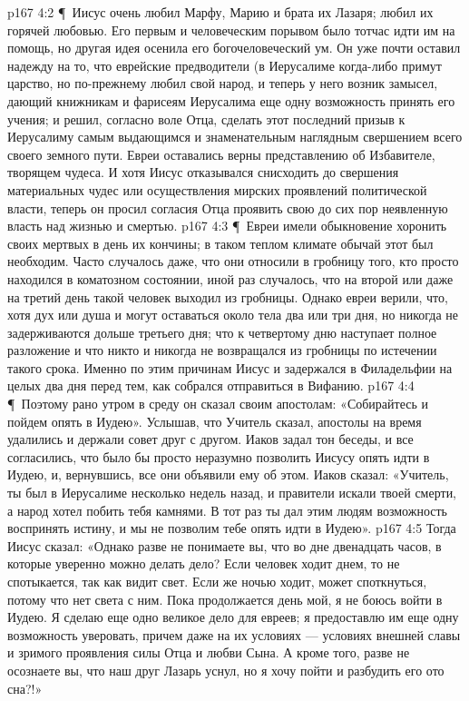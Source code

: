 \vs p167 4:2 \P\ Иисус очень любил Марфу, Марию и брата их Лазаря; любил их горячей любовью. Его первым и человеческим порывом было тотчас идти им на помощь, но другая идея осенила его богочеловеческий ум. Он уже почти оставил надежду на то, что еврейские предводители (в Иерусалиме когда\hyp{}либо примут царство, но по\hyp{}прежнему любил свой народ, и теперь у него возник замысел, дающий книжникам и фарисеям Иерусалима еще одну возможность принять его учения; и решил, согласно воле Отца, сделать этот последний призыв к Иерусалиму самым выдающимся и знаменательным наглядным свершением всего своего земного пути. Евреи оставались верны представлению об Избавителе, творящем чудеса. И хотя Иисус отказывался снисходить до свершения материальных чудес или осуществления мирских проявлений политической власти, теперь он просил согласия Отца проявить свою до сих пор неявленную власть над жизнью и смертью.
\vs p167 4:3 \P\ Евреи имели обыкновение хоронить своих мертвых в день их кончины; в таком теплом климате обычай этот был необходим. Часто случалось даже, что они относили в гробницу того, кто просто находился в коматозном состоянии, иной раз случалось, что на второй или даже на третий день такой человек выходил из гробницы. Однако евреи верили, что, хотя дух или душа и могут оставаться около тела два или три дня, но никогда не задерживаются дольше третьего дня; что к четвертому дню наступает полное разложение и что никто и никогда не возвращался из гробницы по истечении такого срока. Именно по этим причинам Иисус и задержался в Филадельфии на целых два дня перед тем, как собрался отправиться в Вифанию.
\vs p167 4:4 \P\ Поэтому рано утром в среду он сказал своим апостолам: «Собирайтесь и пойдем опять в Иудею». Услышав, что Учитель сказал, апостолы на время удалились и держали совет друг с другом. Иаков задал тон беседы, и все согласились, что было бы просто неразумно позволить Иисусу опять идти в Иудею, и, вернувшись, все они объявили ему об этом. Иаков сказал: «Учитель, ты был в Иерусалиме несколько недель назад, и правители искали твоей смерти, а народ хотел побить тебя камнями. В тот раз ты дал этим людям возможность воспринять истину, и мы не позволим тебе опять идти в Иудею».
\vs p167 4:5 Тогда Иисус сказал: «Однако разве не понимаете вы, что во дне двенадцать часов, в которые уверенно можно делать дело? Если человек ходит днем, то не спотыкается, так как видит свет. Если же ночью ходит, может споткнуться, потому что нет света с ним. Пока продолжается день мой, я не боюсь войти в Иудею. Я сделаю еще одно великое дело для евреев; я предоставлю им еще одну возможность уверовать, причем даже на их условиях --- условиях внешней славы и зримого проявления силы Отца и любви Сына. А кроме того, разве не осознаете вы, что наш друг Лазарь уснул, но я хочу пойти и разбудить его ото сна?!»
